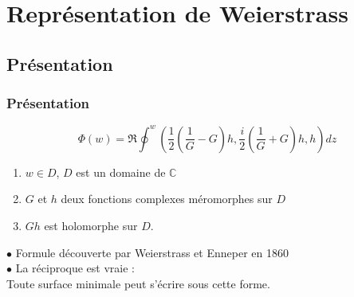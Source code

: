 \documentclass{beamer}
\newcommand{\C}{\mathbb{C}}
\begin{document}

\section{Représentation de Weierstrass}
\subsection{Présentation}

\begin{frame}
\frametitle{Présentation}
$$\Phi(w) = \Re \oint^w \left(
\frac{1}{2}\left(\frac{1}{G}-G\right)h, \frac{i}{2}\left(\frac{1}{G}+G\right)h, h\right) dz $$
\pause
\begin{enumerate}
\item $w\in D$, $D$ est un domaine de $\C$
\item $G$ et $h$ deux fonctions complexes méromorphes sur $D$
\item $Gh$ est holomorphe sur $D$.
\end{enumerate}

$\bullet$ Formule découverte par Weierstrass et Enneper en 1860\\
\pause
$\bullet$ La réciproque est vraie : \\
Toute surface minimale peut s'écrire sous cette forme. 
\end{frame}
\end{document}
